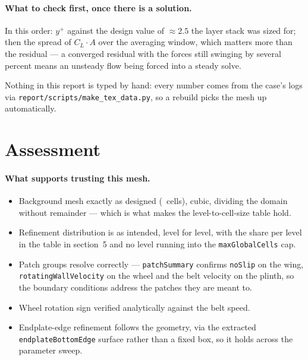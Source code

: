 \documentclass[11pt,a4paper]{article}
\newcommand{\ok}[1]{\textcolor{okc}{#1}}
\begin{document}
\paragraph{What to check first, once there is a solution.} In this order:
$y^+$ against the design value of $\approx 2.5$ the layer stack was sized
for; then the spread of $C_L\!\cdot\!A$ over the averaging window, which
matters more than the residual --- a converged residual with the forces still
swinging by several percent means an unsteady flow being forced into a steady
solve.

\noindent
Nothing in this report is typed by hand: every number comes from the case's
logs via \texttt{report/scripts/make\_tex\_data.py}, so a rebuild picks the
mesh up automatically.

\section{Assessment}

\paragraph{What supports trusting this mesh.}
\begin{itemize}
\item \ok{Background mesh exactly as designed} (\nBaseCells\ cells), cubic,
  dividing the domain without remainder --- which is what makes the
  level-to-cell-size table hold.
\item \ok{Refinement distribution is as intended}, level for level, with the
  share per level in the table in section~5 and no level running into the
  \texttt{maxGlobalCells} cap.
\item \ok{Patch groups resolve correctly} ---
  \texttt{patchSummary} confirms \texttt{noSlip} on the wing,
  \texttt{rotatingWallVelocity} on the wheel and the belt velocity on the
  plinth, so the boundary conditions address the patches they are meant to.
\item \ok{Wheel rotation sign verified} analytically against the belt speed.
\item \ok{Endplate-edge refinement follows the geometry}, via the extracted
  \texttt{endplateBottomEdge} surface rather than a fixed box, so it holds
  across the parameter sweep.
\end{itemize}
\end{document}
